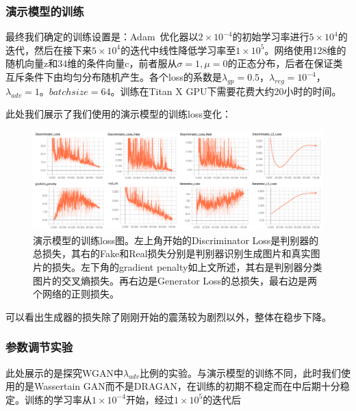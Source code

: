 \documentclass[a4paper,12pt,UTF8]{ctexart}
\newcommand{\kai}{\CJKfamily{zhkai}}	%
\begin{document}
\subsubsection{演示模型的训练}

最终我们确定的训练设置是：Adam~\cite{Kingma2014Adam}优化器以$2 \times 10^{-4}$的初始学习率进行$5 \times 10^{4}$的迭代，然后在接下来$5 \times 10^{4}$的迭代中线性降低学习率至$1 \times 10^{5}$。网络使用128维的随机向量z和34维的条件向量c，前者服从$\sigma=1, \mu=0$的正态分布，后者在保证类互斥条件下由均匀分布随机产生。各个loss的系数是$\lambda_{gp}=0.5$，$\lambda_{reg}=10^{-4}$，$\lambda_{adv}=1$。$batchsize=64$。训练在Titan X GPU下需要花费大约20小时的时间。

此处我们展示了我们使用的演示模型的训练loss变化：

\begin{figure}[H]
  \centering
  \includegraphics[width=1\linewidth]{figs/good_model_dragan.png}
  \caption{\kai 演示模型的训练loss图。左上角开始的Discriminator Loss是判别器的总损失，其右的Fake和Real损失分别是判别器识别生成图片和真实图片的损失。左下角的gradient penalty如上文所述，其右是判别器分类图片的交叉熵损失。再右边是Generator Loss的总损失，最右边是两个网络的正则损失。}
  \label{fig:goodmodel_dragan}
\end{figure}

可以看出生成器的损失除了刚刚开始的震荡较为剧烈以外，整体在稳步下降。


\subsubsection{参数调节实验}

此处展示的是探究WGAN中$\lambda_{adv}$比例的实验。与演示模型的训练不同，此时我们使用的是Wassertain GAN而不是DRAGAN，在训练的初期不稳定而在中后期十分稳定。训练的学习率从$1 \times 10^{-4}$开始，经过$1 \times 10^{5}$的迭代后
\end{document}
